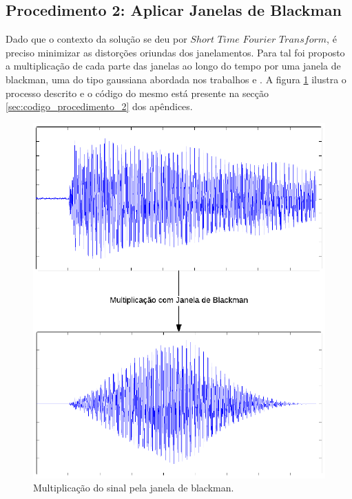 \subsection{Procedimento 2: Aplicar Janelas de Blackman}
\label{subsec:procedimento_2}

Dado que o contexto da solução se deu por $Short$ $Time$ $Fourier$ $Transform$, é preciso minimizar as distorções oriundas dos janelamentos. Para tal foi proposto a multiplicação de cada parte das janelas ao longo do tempo por uma janela de blackman, uma do tipo gaussiana abordada nos trabalhos \cite{cabral2005automatic} e \cite{thoshkahna2011transient}. A figura \ref{fig:procedimento_2} ilustra o processo descrito e o código do mesmo está presente na secção \ref{sec:codigo_procedimento_2} dos apêndices.

\begin{figure}[h] 
  \centering
    \includegraphics[keepaspectratio=true, scale=0.7]{figuras/procedimento_2}
    \caption{Multiplicação do sinal pela janela de blackman.}
    \label{fig:procedimento_2}
\end{figure}

